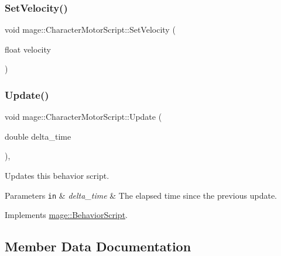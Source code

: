 \hypertarget{classmage_1_1_character_motor_script_a3fd91c324e837b9d22e19d74478caec0}{}\label{classmage_1_1_character_motor_script_a3fd91c324e837b9d22e19d74478caec0} 
\subsubsection{\texorpdfstring{Set\+Velocity()}{SetVelocity()}}
{\footnotesize\ttfamily void mage\+::\+Character\+Motor\+Script\+::\+Set\+Velocity (\begin{DoxyParamCaption}\item[{float}]{velocity }\end{DoxyParamCaption})}

\hypertarget{classmage_1_1_character_motor_script_af09581e810c02ca4a19ecbaf0d7580bb}{}\label{classmage_1_1_character_motor_script_af09581e810c02ca4a19ecbaf0d7580bb} 
\subsubsection{\texorpdfstring{Update()}{Update()}}
{\footnotesize\ttfamily void mage\+::\+Character\+Motor\+Script\+::\+Update (\begin{DoxyParamCaption}\item[{double}]{delta\+\_\+time }\end{DoxyParamCaption})\hspace{0.3cm}{\ttfamily [override]}, {\ttfamily [virtual]}}

Updates this behavior script.


\begin{DoxyParams}[1]{Parameters}
\mbox{\tt in}  & {\em delta\+\_\+time} & The elapsed time since the previous update. \\
\hline
\end{DoxyParams}


Implements \hyperlink{classmage_1_1_behavior_script_a905b6c83640cb91d19fecab3435f6feb}{mage\+::\+Behavior\+Script}.



\subsection{Member Data Documentation}
\hypertarget{classmage_1_1_character_motor_script_a7331e960455b72ceb858254ccc7108f1}{}\label{classmage_1_1_character_motor_script_a7331e960455b72ceb858254ccc7108f1} 

